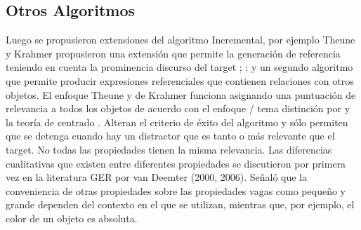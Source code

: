 \subsection{Otros Algoritmos}

Luego se propusieron extensiones del algoritmo Incremental, por ejemplo 
Theune y Krahmer propusieron una extensi\'on que permite la generaci\'on de referencia teniendo en cuenta la prominencia discurso del target \cite{Krahmer:2010:EMN:1880370}; \cite{krahmer}; 
y un segundo algoritmo que permite producir expresiones referenciales que contienen relaciones con otros objetos. El enfoque Theune y de Krahmer funciona asignando una puntuaci\'on de relevancia a todos los objetos de acuerdo con el enfoque / tema distinci\'on por \cite{hajicova-1993} y la teor\'ia de centrado \cite{Grosz:1995:CFM:211190.211198}. Alteran el criterio de \'exito del algoritmo y s\'olo permiten que se detenga cuando hay un distractor que es tanto o m\'as relevante que el target.
No todas las propiedades tienen la misma relevancia. Las diferencias cualitativas que existen entre diferentes propiedades se discutieron por primera vez en la literatura GER por van Deemter (2000, 2006). Se\~nal\'o que la conveniencia de otras propiedades sobre las
propiedades vagas como peque\~no y grande dependen del contexto en el que se utilizan, mientras que, por ejemplo, el color de un objeto es absoluta. 


